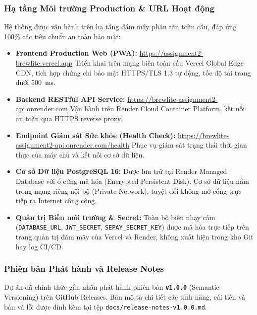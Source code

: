 \documentclass[a4paper]{article}
\begin{document}
\subsubsection{Hạ tầng Môi trường Production \& URL Hoạt động}
Hệ thống được vận hành trên hạ tầng đám mây phân tán toàn cầu, đáp ứng 100\% các tiêu chuẩn an toàn bảo mật:
\begin{itemize}
    \item \textbf{Frontend Production Web (PWA):} \url{https://assignment2-brewlite.vercel.app}  
    Triển khai trên mạng biên toàn cầu Vercel Global Edge CDN, tích hợp chứng chỉ bảo mật HTTPS/TLS 1.3 tự động, tốc độ tải trang dưới 500~ms.
    \item \textbf{Backend RESTful API Service:} \url{https://brewlite-assignment2-api.onrender.com}  
    Vận hành trên Render Cloud Container Platform, kết nối an toàn qua HTTPS reverse proxy.
    \item \textbf{Endpoint Giám sát Sức khỏe (Health Check):} \url{https://brewlite-assignment2-api.onrender.com/health}  
    Phục vụ giám sát trạng thái thời gian thực của máy chủ và kết nối cơ sở dữ liệu.
    \item \textbf{Cơ sở Dữ liệu PostgreSQL 16:} Được lưu trữ tại Render Managed Database với ổ cứng mã hóa (Encrypted Persistent Disk). Cơ sở dữ liệu nằm trong mạng riêng nội bộ (Private Network), tuyệt đối không mở cổng trực tiếp ra Internet công cộng.
    \item \textbf{Quản trị Biến môi trường \& Secret:} Toàn bộ biến nhạy cảm (\texttt{DATABASE\_URL}, \texttt{JWT\_SECRET}, \texttt{SEPAY\_SECRET\_KEY}) được mã hóa trực tiếp trên trang quản trị đám mây của Vercel và Render, không xuất hiện trong kho Git hay log CI/CD.
\end{itemize}

\subsubsection{Phiên bản Phát hành và Release Notes}
Dự án đã chính thức gắn nhãn phát hành phiên bản \textbf{\texttt{v1.0.0}} (Semantic Versioning) trên GitHub Releases. Bản mô tả chi tiết các tính năng, cải tiến và bản vá lỗi được đính kèm tại tệp \texttt{docs/release-notes-v1.0.0.md}.
\end{document}
